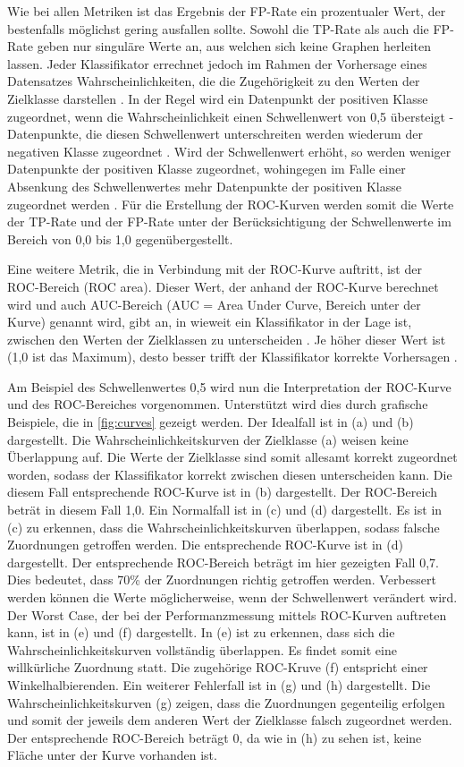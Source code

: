 Wie bei allen Metriken ist das Ergebnis der FP-Rate ein prozentualer Wert, der bestenfalls möglichst gering ausfallen sollte. Sowohl die TP-Rate als auch die FP-Rate geben nur singuläre Werte an, aus welchen sich keine Graphen herleiten lassen. Jeder Klassifikator errechnet jedoch im Rahmen der Vorhersage eines Datensatzes Wahrscheinlichkeiten, die die Zugehörigkeit zu den Werten der Zielklasse darstellen \cite{KNIMETV2019}. In der Regel wird ein Datenpunkt der positiven Klasse zugeordnet, wenn die Wahrscheinlichkeit einen Schwellenwert von 0,5 übersteigt - Datenpunkte, die diesen Schwellenwert unterschreiten werden wiederum der negativen Klasse zugeordnet \cite{KNIMETV2019}. Wird der Schwellenwert erhöht, so werden weniger Datenpunkte der positiven Klasse zugeordnet, wohingegen im Falle einer Absenkung des Schwellenwertes mehr Datenpunkte der positiven Klasse zugeordnet werden \cite{KNIMETV2019}. Für die Erstellung der ROC-Kurven werden somit die Werte der TP-Rate und der FP-Rate unter der Berücksichtigung der Schwellenwerte im Bereich von 0,0 bis 1,0 gegenübergestellt.

Eine weitere Metrik, die in Verbindung mit der ROC-Kurve auftritt, ist der ROC-Bereich (ROC area). Dieser Wert, der anhand der ROC-Kurve berechnet wird und auch AUC-Bereich (AUC = Area Under Curve, Bereich unter der Kurve) genannt wird, gibt an, in wieweit ein Klassifikator in der Lage ist, zwischen den Werten der Zielklassen zu unterscheiden \cite{Narkhede2018}. Je höher dieser Wert ist (1,0 ist das Maximum), desto besser trifft der Klassifikator korrekte Vorhersagen \cite{Narkhede2018}.

Am Beispiel des Schwellenwertes 0,5 wird nun die Interpretation der ROC-Kurve und des ROC-Bereiches vorgenommen. Unterstützt wird dies durch grafische Beispiele, die in \autoref{fig:curves} gezeigt werden. Der Idealfall ist in (a) und (b) dargestellt. Die Wahrscheinlichkeitskurven der Zielklasse (a) weisen keine Überlappung auf. Die Werte der Zielklasse sind somit allesamt korrekt zugeordnet worden, sodass der Klassifikator korrekt zwischen diesen unterscheiden kann. Die diesem Fall entsprechende ROC-Kurve ist in (b) dargestellt. Der ROC-Bereich beträt in diesem Fall 1,0. Ein \glqq Normalfall\grqq{} ist in (c) und (d) dargestellt. Es ist in (c) zu erkennen, dass die Wahrscheinlichkeitskurven überlappen, sodass falsche Zuordnungen getroffen werden. Die entsprechende ROC-Kurve ist in (d) dargestellt. Der entsprechende ROC-Bereich beträgt im hier gezeigten Fall 0,7. Dies bedeutet, dass 70\% der Zuordnungen richtig getroffen werden. Verbessert werden können die Werte möglicherweise, wenn der Schwellenwert verändert wird. Der \glqq Worst Case\grqq, der bei der Performanzmessung mittels ROC-Kurven auftreten kann, ist in (e) und (f) dargestellt. In (e) ist zu erkennen, dass sich die Wahrscheinlichkeitskurven vollständig überlappen. Es findet somit eine willkürliche Zuordnung statt. Die zugehörige ROC-Kruve (f) entspricht einer Winkelhalbierenden. Ein weiterer Fehlerfall ist in (g) und (h) dargestellt. Die Wahrscheinlichkeitskurven (g) zeigen, dass die Zuordnungen gegenteilig erfolgen und somit der jeweils dem anderen Wert der Zielklasse falsch zugeordnet werden. Der entsprechende ROC-Bereich beträgt 0, da wie in (h) zu sehen ist, keine Fläche unter der Kurve vorhanden ist.

